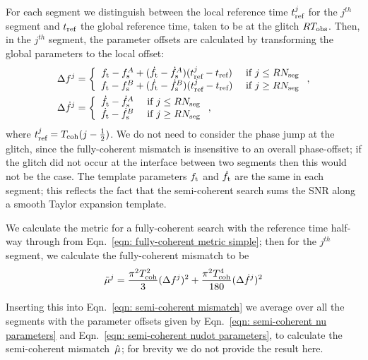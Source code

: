 \documentclass[../full_thesis/full_thesis.tex]{subfiles}
\begin{document}
For each segment we distinguish between the local reference time $t_{\textrm{ref}}^j$ for
the $j^{th}$ segment and $t_{\textrm{ref}}$ the global reference time, taken to be at the
glitch $RT_{\mathrm{obs}}$. Then, in the $j^{th}$ segment, the parameter offsets are calculated
by transforming the global parameters to the local offset:
\begin{align}
\Delta f^j & = \left\{
\begin{array}{cc}
{f_{\textrm{t}}} - f_{\textrm{s}}^A + (\dot{f}_{\textrm{t}} - \dot{f}_{\textrm{s}}^A)(t_{\textrm{ref}}^{j} - t_{\textrm{ref}})& \textrm{ if } j \le RN_{\textrm{seg}} \\
{f_{\textrm{t}}} - f_{\textrm{s}}^B + (\dot{f}_{\textrm{t}} - \dot{f}_{\textrm{s}}^B)(t_{\textrm{ref}}^{j} - t_{\textrm{ref}})& \textrm{ if } j \ge RN_{\textrm{seg}}
\end{array}\right.,
\label{eqn: semi-coherent nu parameters}
\\
\Delta\dot{f}^j &= \left\{
\begin{array}{cc}
\dot{f}_{\textrm{t}} - \dot{f}_{\textrm{s}}^A & \textrm{ if } j \le RN_{\textrm{seg}} \\
\dot{f}_{\textrm{t}} - \dot{f}_{\textrm{s}}^B & \textrm{ if } j \ge RN_{\textrm{seg}}
\end{array}\right.,
\label{eqn: semi-coherent nudot parameters}
\end{align}
where $t_{\textrm{ref}}^{j} = T_{\mathrm{coh}}(j - \frac{1}{2})$. We do not need to consider the
phase jump at the glitch, since the fully-coherent mismatch is insensitive
to an overall phase-offset; if the glitch did not occur
at the interface between two segments then this would not be the case.  The
template parameters ${f_{\textrm{t}}}$ and $\dot{f}_{\textrm{t}}$ are the same in each segment; this
reflects the fact that the semi-coherent search sums the SNR along a smooth
Taylor expansion template.

We calculate the metric for a fully-coherent search with the reference time
half-way through from Eqn.~\eqref{eqn: fully-coherent metric simple}; then for
the $j^{th}$ segment, we calculate the fully-coherent mismatch to be
\begin{align}
\tilde{\mu}^j = \frac{\pi^{2}T_{\mathrm{coh}}^{2}}{3} (\Delta f^{j})^{2}
+ \frac{\pi^{2}T_{\mathrm{coh}}^{4}}{180}(\Delta\dot{f}^j)^{2}
\end{align}

Inserting this into Eqn.~\eqref{eqn: semi-coherent mismatch} we average over all
the segments with the parameter offsets given by Eqn.~\eqref{eqn: semi-coherent
nu parameters} and Eqn.~\eqref{eqn: semi-coherent nudot parameters}, to calculate
the semi-coherent mismatch~$\hat{\mu}$; for brevity we do not provide the result here.
\end{document}
